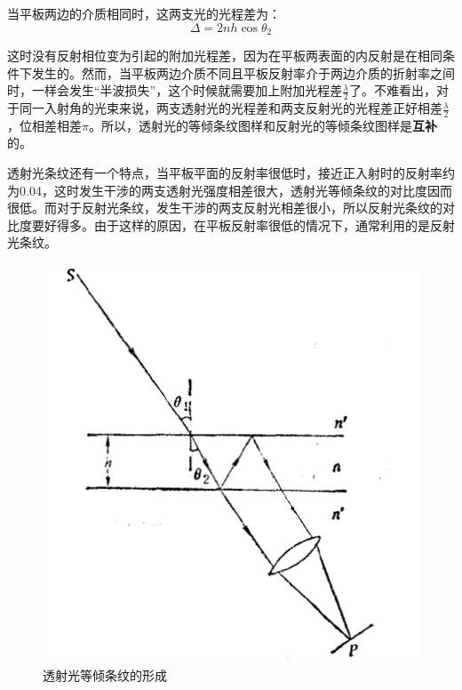 \documentclass[UTF8]{ctexart}
\begin{document}
\noindent 当平板两边的介质相同时，这两支光的光程差为：
\begin{equation}
	\Delta = 2n h \cos \theta_{2}
\end{equation}

\noindent 这时没有反射相位变为引起的附加光程差，因为在平板两表面的内反射是在相同条件下发生的。然而，当平板两边介质不同且平板反射率介于两边介质的折射率之间时，一样会发生“半波损失”，这个时候就需要加上附加光程差$ \frac{\lambda}{2} $了。不难看出，对于同一入射角的光束来说，两支透射光的光程差和两支反射光的光程差正好相差$ \frac{\lambda}{2} $，位相差相差$ \pi $。所以，透射光的等倾条纹图样和反射光的等倾条纹图样是\textbf{互补}的。

	透射光条纹还有一个特点，当平板平面的反射率很低时，接近正入射时的反射率约为0.04，这时发生干涉的两支透射光强度相差很大，透射光等倾条纹的对比度因而很低。而对于反射光条纹，发生干涉的两支反射光相差很小，所以反射光条纹的对比度要好得多。由于这样的原因，在平板反射率很低的情况下，通常利用的是反射光条纹。
	\newpage
	
		\begin{figure}[htbp]
		\centering
		\includegraphics[width=12cm]{traver_light.png}
		\caption{透射光等倾条纹的形成}
		\label{figure_traver}
	\end{figure}
\end{document}
